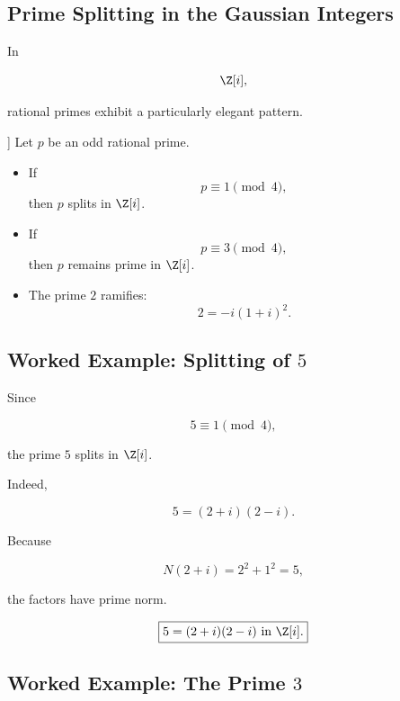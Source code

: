 \subsection{Prime Splitting in the Gaussian Integers}
\label{subsec:prime-splitting-gaussian}

In

\[ \Z[i], \]

rational primes exhibit a particularly elegant pattern.

\begin{theorem}[Prime Behavior in \(\Z[i]\)]
Let \(p\) be an odd rational prime.

\begin{itemize}
    \item If
    \[ p\equiv1\pmod4, \]
    then \(p\) splits in \(\Z[i]\).

    \item If
    \[ p\equiv3\pmod4, \]
    then \(p\) remains prime in \(\Z[i]\).

    \item The prime \(2\) ramifies:
    \[ 2=-i(1+i)^2. \]
\end{itemize}
\end{theorem}

\subsection{Worked Example: Splitting of \(5\)}
\label{subsec:worked-splitting-five}

Since

\[ 5\equiv1\pmod4, \]

the prime \(5\) splits in \(\Z[i]\).

Indeed,

\[ 5=(2+i)(2-i). \]

Because

\[ N(2+i)=2^2+1^2=5, \]

the factors have prime norm.

\begin{answerbox}
\[ \boxed{5=(2+i)(2-i)\text{ in }\Z[i].} \]
\end{answerbox}

\subsection{Worked Example: The Prime \(3\)}
\label{subsec:worked-inert-three}

